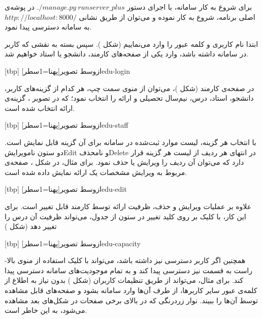 
برای شروع به کار سامانه، با اجرای دستور $./manage.py~runserver\_plus$
در پوشه‌ی اصلی برنامه،  شروع به کار نموده و می‌توان از طریق
نشانی $http://localhost:8000/$ به   سامانه دسترسی پیدا
نمود.

ابتدا نام کاربری و کلمه عبور را وارد می‌نماییم (شکل
). سپس بسته به نقشی که کاربر در سامانه داشته باشد،
وارد یکی از صفحه‌های کارمند، دانشجو یا استاد خواهیم شد.

[tbp]
‌ازوسط
‌تصویر[پهنا=1‌سطر]{edu-login}

در صفحه‌ی کارمند (شکل )، می‌توان از منوی سمت چپ، هر
کدام از گزینه‌های کاربر، دانشجو، استاد، درس، نیم‌سال تحصیلی و ارائه را
انتخاب نمود؛ که در تصویر ، گزینه‌ی ارائه انتخاب شده
است.

[tbp]
‌ازوسط
‌تصویر[پهنا=1‌سطر]{edu-staff}

با انتخاب هر گزینه، لیست موارد ثبت‌شده در سامانه برای آن گزینه قابل
نمایش است. دو ستون نام{ویرایش}{Edit} و نام{حذف}{Delete} در انتهای هر
ردیف از لیست هر گزینه قرار دارد که می‌توان آن ردیف را ویرایش یا حذف
نمود. برای مثال، در شکل ، صفحه‌ی مربوط به ویرایش
مشخصات یک ارائه نمایش داده شده است.

[tbp]
‌ازوسط
‌تصویر[پهنا=1‌سطر]{edu-edit}

علاوه بر عملیات ویرایش و حذف، ظرفیت ارائه توسط کارمند قابل تغییر
است. برای این کار، با کلیک بر روی کلید تغییر در ستون
 از جدول، می‌تواند ظرفیت آن درس را تغییر دهد (شکل
)

[tbp]
‌ازوسط
‌تصویر[پهنا=1‌سطر]{edu-capacity}

همچنین اگر کاربر دسترسی  نیز داشته باشد،
می‌تواند با کلیک استفاده از منوی بالا-راست به قسمت  نیز دسترسی پیدا کند و به تمام
موجودیت‌های سامانه دسترسی پیدا کند. برای مثال، می‌تواند از طریق تنظیمات
کاربران (شکل ) بدون نیاز به اطلاع از کلمه‌ی عبور
سایر کاربرها، از طرف آن‌ها وارد سامانه بشود و صفحه‌های قابل مشاهده توسط
آن‌ها را ببیند. نوار زرد‌رنگی که در بالای برخی صفحات در شکل‌های بعد
مشاهده می‌شود، به این خاطر است.

